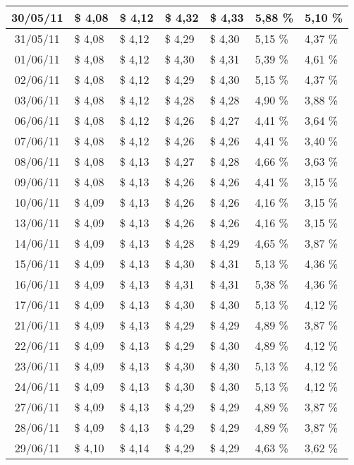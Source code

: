 \begin{center}
\begin{longtable}{|c|p{1.5cm}|p{1.5cm}|p{1.5cm}|p{1.5cm}|p{1.5cm}|p{1.5cm}|}
30/05/11 & \$ 4,08 & \$ 4,12 & \$ 4,32 & \$ 4,33 & 5,88 \% & 5,10 \% \\ \hline
31/05/11 & \$ 4,08 & \$ 4,12 & \$ 4,29 & \$ 4,30 & 5,15 \% & 4,37 \% \\ \hline
01/06/11 & \$ 4,08 & \$ 4,12 & \$ 4,30 & \$ 4,31 & 5,39 \% & 4,61 \% \\ \hline
02/06/11 & \$ 4,08 & \$ 4,12 & \$ 4,29 & \$ 4,30 & 5,15 \% & 4,37 \% \\ \hline
03/06/11 & \$ 4,08 & \$ 4,12 & \$ 4,28 & \$ 4,28 & 4,90 \% & 3,88 \% \\ \hline
06/06/11 & \$ 4,08 & \$ 4,12 & \$ 4,26 & \$ 4,27 & 4,41 \% & 3,64 \% \\ \hline
07/06/11 & \$ 4,08 & \$ 4,12 & \$ 4,26 & \$ 4,26 & 4,41 \% & 3,40 \% \\ \hline
08/06/11 & \$ 4,08 & \$ 4,13 & \$ 4,27 & \$ 4,28 & 4,66 \% & 3,63 \% \\ \hline
09/06/11 & \$ 4,08 & \$ 4,13 & \$ 4,26 & \$ 4,26 & 4,41 \% & 3,15 \% \\ \hline
10/06/11 & \$ 4,09 & \$ 4,13 & \$ 4,26 & \$ 4,26 & 4,16 \% & 3,15 \% \\ \hline
13/06/11 & \$ 4,09 & \$ 4,13 & \$ 4,26 & \$ 4,26 & 4,16 \% & 3,15 \% \\ \hline
14/06/11 & \$ 4,09 & \$ 4,13 & \$ 4,28 & \$ 4,29 & 4,65 \% & 3,87 \% \\ \hline
15/06/11 & \$ 4,09 & \$ 4,13 & \$ 4,30 & \$ 4,31 & 5,13 \% & 4,36 \% \\ \hline
16/06/11 & \$ 4,09 & \$ 4,13 & \$ 4,31 & \$ 4,31 & 5,38 \% & 4,36 \% \\ \hline
17/06/11 & \$ 4,09 & \$ 4,13 & \$ 4,30 & \$ 4,30 & 5,13 \% & 4,12 \% \\ \hline
21/06/11 & \$ 4,09 & \$ 4,13 & \$ 4,29 & \$ 4,29 & 4,89 \% & 3,87 \% \\ \hline
22/06/11 & \$ 4,09 & \$ 4,13 & \$ 4,29 & \$ 4,30 & 4,89 \% & 4,12 \% \\ \hline
23/06/11 & \$ 4,09 & \$ 4,13 & \$ 4,30 & \$ 4,30 & 5,13 \% & 4,12 \% \\ \hline
24/06/11 & \$ 4,09 & \$ 4,13 & \$ 4,30 & \$ 4,30 & 5,13 \% & 4,12 \% \\ \hline
27/06/11 & \$ 4,09 & \$ 4,13 & \$ 4,29 & \$ 4,29 & 4,89 \% & 3,87 \% \\ \hline
28/06/11 & \$ 4,09 & \$ 4,13 & \$ 4,29 & \$ 4,29 & 4,89 \% & 3,87 \% \\ \hline
29/06/11 & \$ 4,10 & \$ 4,14 & \$ 4,29 & \$ 4,29 & 4,63 \% & 3,62 \% \\ \hline

\end{longtable}
\end{center}
